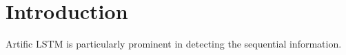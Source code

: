\section{Introduction}
Artific
LSTM is particularly prominent in detecting the sequential information. 